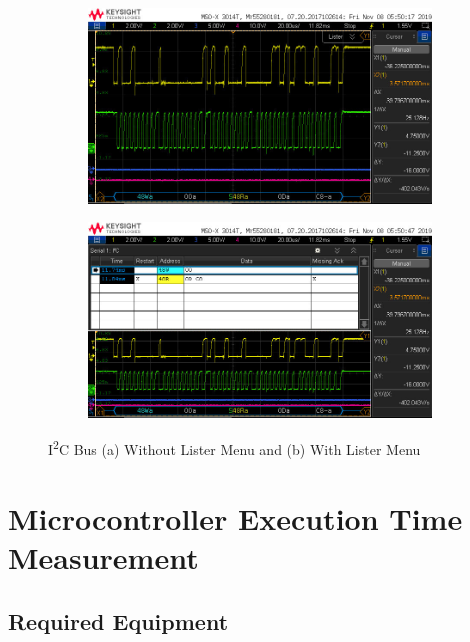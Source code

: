 \documentclass{article}
\begin{document}
  \begin{figure}[ht]
    \begin{subfigure}[b]{.5\textwidth}
      \includegraphics[width=\linewidth]{images/i2c/i2c.jpg}
      \caption{}
      \label{fig:i2c}
    \end{subfigure}
    \begin{subfigure}[b]{.5\textwidth}
      \includegraphics[width=\linewidth]{images/i2c/i2c_lister.jpg}
      \caption{}
      \label{fig:i2c_lister}
    \end{subfigure}
    \caption{
      I\textsuperscript{2}C Bus (a) Without Lister Menu and (b) With Lister Menu
    }
    \label{fig:i2c_decode}
  \end{figure}

  \section{Microcontroller Execution Time Measurement}

  \subsection{Required Equipment}
\end{document}
